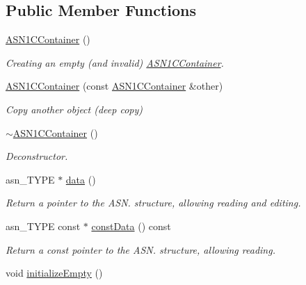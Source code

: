 \subsection*{Public Member Functions}
\begin{DoxyCompactItemize}
\item 
\hyperlink{classASN1CContainer_ad8d69cd8ce21023ea36410113162a008}{A\+S\+N1\+C\+Container} ()
\begin{DoxyCompactList}\small\item\em Creating an empty (and invalid) \hyperlink{classASN1CContainer}{A\+S\+N1\+C\+Container}. \end{DoxyCompactList}\item 
\hyperlink{classASN1CContainer_a0fdf5aaaef51b6b9c1e10442e6e72890}{A\+S\+N1\+C\+Container} (const \hyperlink{classASN1CContainer}{A\+S\+N1\+C\+Container} \&other)
\begin{DoxyCompactList}\small\item\em Copy another object (deep copy) \end{DoxyCompactList}\item 
\hyperlink{classASN1CContainer_a26020bb451f75d62ae28bc43568aee17}{$\sim$\+A\+S\+N1\+C\+Container} ()
\begin{DoxyCompactList}\small\item\em Deconstructor. \end{DoxyCompactList}\item 
asn\+\_\+\+T\+Y\+PE $\ast$ \hyperlink{classASN1CContainer_a025329e80ae2a3216fc1d1cf6a8f957d}{data} ()
\begin{DoxyCompactList}\small\item\em Return a pointer to the A\+S\+N. structure, allowing reading and editing. \end{DoxyCompactList}\item 
asn\+\_\+\+T\+Y\+PE const $\ast$ \hyperlink{classASN1CContainer_a7db5e6ea01cfc7dc209b73788a034b81}{const\+Data} () const 
\begin{DoxyCompactList}\small\item\em Return a const pointer to the A\+S\+N. structure, allowing reading. \end{DoxyCompactList}\item 
void \hyperlink{classASN1CContainer_a7c7691789087f204c37207590eaaf89d}{initialize\+Empty} ()\hypertarget{classASN1CContainer_a7c7691789087f204c37207590eaaf89d}{}\label{classASN1CContainer_a7c7691789087f204c37207590eaaf89d}


\end{DoxyCompactItemize}
